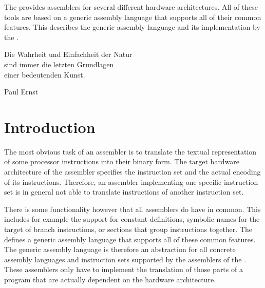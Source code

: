 




\renewcommand{\seeassembly}{}

{The \ecs{} provides assemblers for several different hardware architectures.
All of these tools are based on a generic assembly language that supports all of their common features.
This \documentation{} describes the generic assembly language and its implementation by the \ecs{}.}

\epigraph{Die Wahrheit und Einfachheit der Natur \\ sind immer die letzten Grundlagen \\ einer bedeutenden Kunst.}{Paul Ernst}

\section{Introduction}

The most obvious task of an assembler is to translate the textual representation of some processor instructions into their binary form.
The target hardware architecture of the assembler specifies the instruction set and the actual encoding of its instructions.
Therefore, an assembler implementing one specific instruction set is in general not able to translate instructions of another instruction set.

There is some functionality however that all assemblers do have in common.
This includes for example the support for constant definitions, symbolic names for the target of branch instructions, or sections that group instructions together.
The \ecs{} defines a generic assembly language that supports all of these common features.
The generic assembly language is therefore an abstraction for all concrete assembly languages and instruction sets supported by the assemblers of the \ecs{}.
These assemblers only have to implement the translation of those parts of a program that are actually dependent on the hardware architecture.

